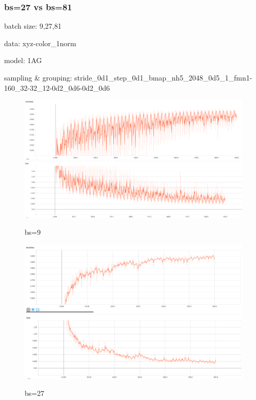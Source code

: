 \documentclass[,table,dvipsnames]{article}
\begin{document}
\subsubsection{bs=27 vs bs=81}
batch size: 9,27,81 \par
data: xyz-color\_1norm\par
model: 1AG\par
sampling \& grouping: stride\_0d1\_step\_0d1\_bmap\_nh5\_2048\_0d5\_1\_fmn1-160\_32-32\_12-0d2\_0d6-0d2\_0d6\par
\begin{figure}[h!]
	\caption{bs=9}
	\centering
	\includegraphics[width=\textwidth]{acc_log-model_1AG-gsbb_2C1-bs9-xyz-color_1norm-2048-mat}
	\includegraphics[width=\textwidth]{loss_log-model_1AG-gsbb_2C1-bs9-xyz-color_1norm-2048-mat}
\end{figure}
\begin{figure}[h!]
	\caption{bs=27}
	\centering
	\includegraphics[width=\textwidth]{acc_log-model_1AG-gsbb_2C1-bs27-xyz-color_1norm-2048-mat}
	\includegraphics[width=\textwidth]{loss_log-model_1AG-gsbb_2C1-bs27-xyz-color_1norm-2048-mat}
\end{figure}
\end{document}
